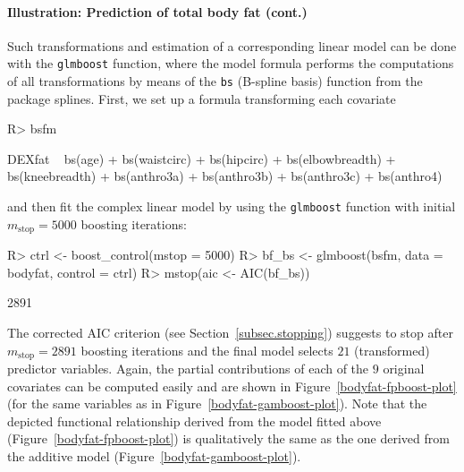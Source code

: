 \documentclass{article}
\newcommand{\Rpackage}[1]{{\normalfont\fontseries{b}\selectfont #1}}
\newcommand{\Rcmd}[1]{\texttt{#1}}
\newenvironment{Schunk}{}{}
\begin{document}
 

\paragraph{Illustration: Prediction of total body fat (cont.)}


Such transformations and estimation of a corresponding linear model can be
done with the \Rcmd{glmboost} function,
where the model formula performs the computations of all transformations by 
means of the \Rcmd{bs} (B-spline basis) function from the package
\Rpackage{splines}.  
First, we set up a formula transforming each covariate 
\begin{Schunk}
\begin{Sinput}
R> bsfm
\end{Sinput}
\begin{Soutput}
DEXfat ~ bs(age) + bs(waistcirc) + bs(hipcirc) + bs(elbowbreadth) + 
    bs(kneebreadth) + bs(anthro3a) + bs(anthro3b) + bs(anthro3c) + 
    bs(anthro4)
\end{Soutput}
\end{Schunk}
and then fit the complex linear model by using the \Rcmd{glmboost} function with 
initial $m_\text{stop} = 5000$ boosting iterations:
\begin{Schunk}
\begin{Sinput}
R> ctrl <- boost_control(mstop = 5000)
R> bf_bs <- glmboost(bsfm, data = bodyfat, control = ctrl)
R> mstop(aic <- AIC(bf_bs))
\end{Sinput}
\begin{Soutput}
[1] 2891
\end{Soutput}
\end{Schunk}
The corrected AIC criterion (see Section~\ref{subsec.stopping}) suggests to
stop after $m_\text{stop} = 2891$ 
boosting iterations and the final model selects
$21$ (transformed) predictor
variables. Again, the partial 
contributions of each of the $9$ original covariates
can be computed 
easily and are shown in Figure~\ref{bodyfat-fpboost-plot} (for the same
variables as in Figure~\ref{bodyfat-gamboost-plot}). Note that the depicted
functional relationship derived from the model fitted above
(Figure~\ref{bodyfat-fpboost-plot}) is qualitatively the same as the one
derived from the additive model (Figure~\ref{bodyfat-gamboost-plot}).
\end{document}
